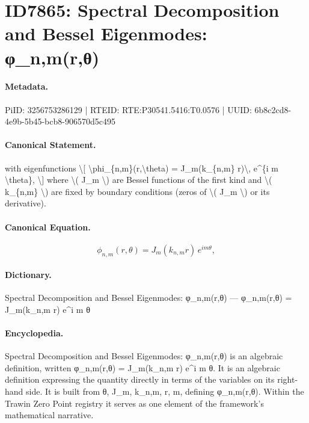 \section*{ID7865: Spectral Decomposition and Bessel Eigenmodes: φ\_n,m(r,θ)}
\paragraph{Metadata.}
PiID: 3256753286129 | RTEID: RTE:P30541.5416:T0.0576 | UUID: 6b8c2cd8-4e9b-5b45-bcb8-906570d5c495

\paragraph{Canonical Statement.}
with eigenfunctions \textbackslash{}[ \textbackslash{}phi\_\{n,m\}(r,\textbackslash{}theta) = J\_m(k\_\{n,m\} r)\textbackslash{}, e\textasciicircum{}\{i m \textbackslash{}theta\}, \textbackslash{}] where \textbackslash{}( J\_m \textbackslash{}) are Bessel functions of the first kind and \textbackslash{}( k\_\{n,m\} \textbackslash{}) are fixed by boundary conditions (zeros of \textbackslash{}( J\_m \textbackslash{}) or its derivative).

\paragraph{Canonical Equation.}
\[
\phi_{n,m}(r,\theta) = J_m(k_{n,m} r)\, e^{i m \theta},
\]

\paragraph{Dictionary.}
Spectral Decomposition and Bessel Eigenmodes: φ\_n,m(r,θ) — φ\_n,m(r,θ) = J\_m(k\_n,m r) e\textasciicircum{}i m θ

\paragraph{Encyclopedia.}
Spectral Decomposition and Bessel Eigenmodes: φ\_n,m(r,θ) is an algebraic definition, written φ\_n,m(r,θ) = J\_m(k\_n,m r) e\textasciicircum{}i m θ. It is an algebraic definition expressing the quantity directly in terms of the variables on its right-hand side. It is built from θ, J\_m, k\_n,m, r, m, defining φ\_n,m(r,θ). Within the Trawin Zero Point registry it serves as one element of the framework's mathematical narrative.
